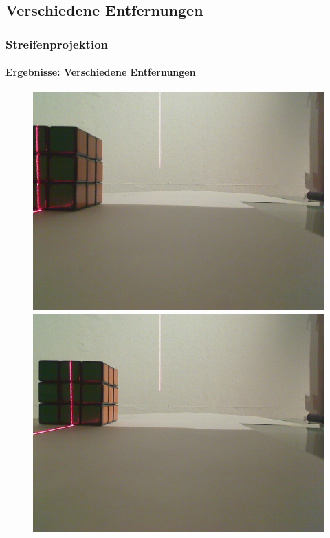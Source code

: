 \documentclass[xcolor=dvipsnames]{beamer}
\begin{document}
\subsection{Verschiedene Entfernungen}
\begin{frame}
	\frametitle{Streifenprojektion}
	\framesubtitle{Ergebnisse: Verschiedene Entfernungen}

	\begin{figure}
		\begin{minipage}{0.32\linewidth}
			\includegraphics[width=\linewidth]{includes/test_dist_1}
		\end{minipage}
		\hfill
		\begin{minipage}{0.32\linewidth}
			\includegraphics[width=\linewidth]{includes/test_dist_2}

\end{minipage}
\end{figure}
\end{frame}
\end{document}

